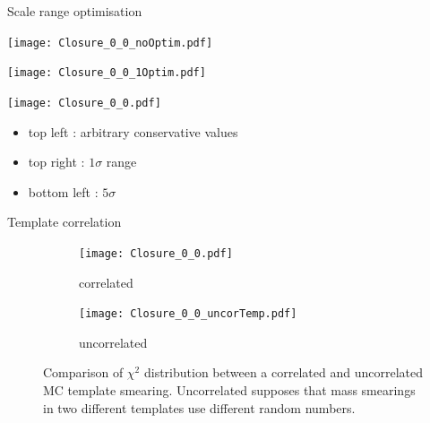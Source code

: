 \begin{frame}{Scale range optimisation}
  \begin{minipage}{0.49\linewidth}
      \texttt{[image: Closure\_0\_0\_noOptim.pdf]}
  \end{minipage}
  \hfill
  \begin{minipage}{0.49\linewidth}
      \texttt{[image: Closure\_0\_0\_1Optim.pdf]}
  \end{minipage}
  \begin{minipage}{0.49\linewidth}
      \texttt{[image: Closure\_0\_0.pdf]}
  \end{minipage}
  \hfill
  \begin{minipage}{0.49\linewidth}
    \begin{itemize}
    \item top left : arbitrary conservative values
    \item top right : $1\sigma$ range
    \item bottom left : $5\sigma$
    \end{itemize}
  \end{minipage}
\end{frame}
\begin{frame}{Template correlation}
  \begin{figure}
\begin{subfigure}[t]{0.49\linewidth}
\begin{center}
\texttt{[image: Closure\_0\_0.pdf]}
\end{center}
\caption{correlated}
\end{subfigure}
\begin{subfigure}[t]{0.49\linewidth}
\begin{center}
\texttt{[image: Closure\_0\_0\_uncorTemp.pdf]}
\end{center}
\caption{uncorrelated}
\end{subfigure}
\caption{\label{orgff6a45b}
Comparison of $\chi^2$ distribution between a correlated and uncorrelated MC template smearing. Uncorrelated supposes that mass smearings in two different templates use different random numbers.}
\end{figure}
\end{frame}

